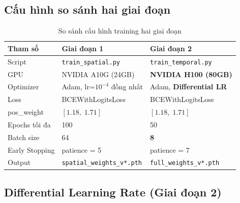 \documentclass[12pt,a4paper]{article}
\begin{document}
\subsection{Cấu hình so sánh hai giai đoạn}

\begin{table}[h!]
\centering
{}
\begin{tabular}{lll}
\toprule
\textbf{Tham số} & \textbf{Giai đoạn 1} & \textbf{Giai đoạn 2} \\
\midrule
Script & \texttt{train\_spatial.py} & \texttt{train\_temporal.py} \\
GPU & NVIDIA A10G (24GB) & \textbf{NVIDIA H100 (80GB)} \\
Optimizer & Adam, lr=$10^{-4}$ đồng nhất & Adam, \textbf{Differential LR} \\
Loss & BCEWithLogitsLoss & BCEWithLogitsLoss \\
pos\_weight & $[1.18,\; 1.71]$ & $[1.18,\; 1.71]$ \\
Epochs tối đa & 100 & 50 \\
Batch size & 64 & \textbf{8} \\
Early Stopping & patience = 5 & patience = 7 \\
Output & \texttt{spatial\_weights\_v*.pth} & \texttt{full\_weights\_v*.pth} \\
\bottomrule
\end{tabular}
\caption{So sánh cấu hình training hai giai đoạn}
\end{table}

\subsection{Differential Learning Rate (Giai đoạn 2)}
\end{document}
